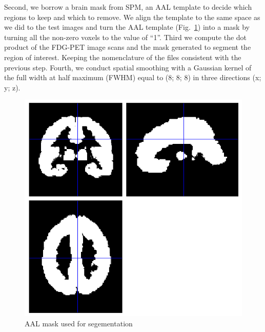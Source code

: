 Second, we borrow a brain mask from SPM, an AAL template to decide which regions to keep and which to remove. We align the template to the same space as we did to the test images and turn the AAL template (Fig.~\ref{fig:mask}) into a mask by turning all the non-zero voxels to the value of ``1''. Third we compute the dot product of the FDG-PET image scans and the mask generated to segment the region of interest. Keeping the nomenclature of the files consistent with the previous step. Fourth, we conduct spatial smoothing with a Gaussian kernel of the full width at half maximum (FWHM) equal to (8; 8; 8) in three directions (x; y; z).
\begin{figure}[h]
	\centering
	\includegraphics[width=\linewidth]{figures/mask}
	\caption[AAL mask used for segementation]{AAL mask used for segementation}
	\label{fig:mask}
\end{figure}

 
